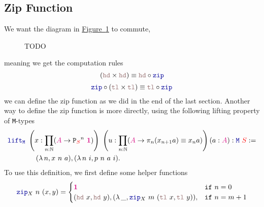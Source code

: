 \documentclass[twoside,11pt,openright]{report}
\theoremstyle{plain} %
\theoremstyle{definition}
\theoremstyle{remark}
\newcommand*{\figref}[1]{\hyperref[fig:#1]{Figure~\ref*{fig:#1}}}
\newcommand*{\type}[1]{\textcolor{magenta!90!black}{#1}}
\newcommand*{\container}[1]{\textcolor{red}{#1}}
\newcommand*{\unit}{\type{\textbf{1}}}
\newcommand*{\function}[1]{\textcolor{blue!60!black}{\ensuremath{\mathtt{#1}}}}
\newcommand*{\destructor}[1]{\textcolor{pink!60!black}{\ensuremath{\mathtt{#1}}}}
\newcommand*{\typeformer}[1]{\ensuremath{\mathtt{#1}}}
\newcommand*{\functor}[1]{\ensuremath{\mathbf{\mathtt{#1}}}}
\begin{document}
\subsection{Zip Function}
We want the diagram in \figref{zip-computation-rules} to commute,
\begin{figure}[h]
  \centering
  \caption{TODO}
  \label{fig:zip-computation-rules}
\end{figure}
meaning we get the computation rules
\begin{equation}
  (\destructor{hd} \times \destructor{hd}) \equiv \destructor{hd} \circ \function{zip}
\end{equation}
\begin{equation}
  \function{zip} \circ (\destructor{tl} \times \destructor{tl}) \equiv \destructor{tl} \circ \function{zip}
\end{equation}
we can define the zip function as we did in the end of the last section. Another way to define the zip function is more directly, using the following lifting property of \texttt{M}-types
\begin{equation}
  \begin{aligned}
    &\function{lift_M}~\left(x : \prod_{n : \mathbb{N}} (\type{A} \rightarrow {\functor{P}_{\container{S}}}^n~\unit)\right)~\left(u : \prod_{n : \mathbb{N}} (\type{A} \rightarrow \pi_n (x_{n+1} a) \equiv x_n a)\right) (a : \type{A}) : \function{M}~\container{S} := \\
    &\qquad\qquad (\lambda\,n, x~n~a) , (\lambda\,n~i, p~n~a~i).
  \end{aligned} \label{eq:M-lift}
\end{equation}
To use this definition, we first define some helper functions
\begin{equation}
  \function{zip}_{X}~n~(x , y) = \begin{cases} \unit & \mathtt{if}~n = 0 \\ (\destructor{hd}~x , \destructor{hd}~y) , (\lambda\,\_, \function{zip}_{X}~m~(\destructor{tl}~x,\destructor{tl}~y)) , & \mathtt{if}~n = m + 1 \end{cases}
\end{equation}
\end{document}
